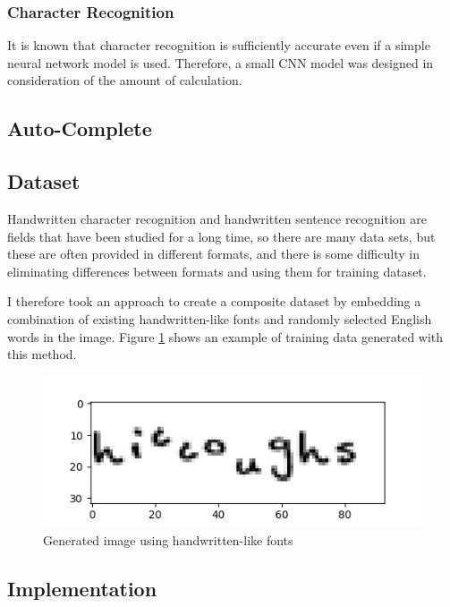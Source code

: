 \subsubsection{Character Recognition}

It is known that character recognition is sufficiently accurate even if
a simple neural network model is used. Therefore, a small CNN model was designed
in consideration of the amount of calculation.

\subsection{Auto-Complete}

\subsection{Dataset}

Handwritten character recognition and handwritten sentence recognition are
fields that have been studied for a long time, so there are many data sets,
but these are often provided in different formats, and there is some difficulty
in eliminating differences between formats and using them for training dataset.

I therefore took an approach to create a composite dataset by
embedding a combination of existing handwritten-like fonts and
randomly selected English words in the image.
Figure \ref{fig:generated_image} shows an example of training data generated with this method.

\begin{figure}
    \centering
    \includegraphics[width=\linewidth]{images/generated_image.png}
    \caption{Generated image using handwritten-like fonts}
    \label{fig:generated_image}
\end{figure}

\subsection{Implementation}



